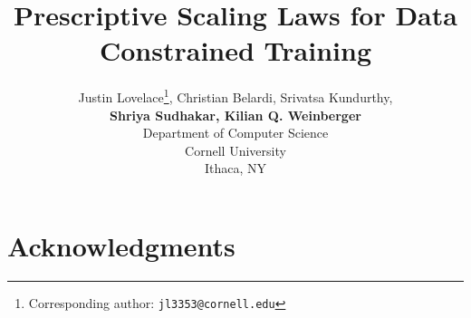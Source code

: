 \documentclass{article} %
\title{Prescriptive Scaling Laws for Data Constrained Training}
\author{Justin Lovelace\thanks{Corresponding author: \texttt{jl3353@cornell.edu}}, Christian Belardi, Srivatsa Kundurthy, \\ \textbf{Shriya Sudhakar, Kilian Q. Weinberger} \\
Department of Computer Science \\
Cornell University \\
Ithaca, NY
}
\begin{document}
\ifcolmsubmission
\linenumbers
\fi

\maketitle





















% 


\section*{Acknowledgments}






\appendix






\end{document}
